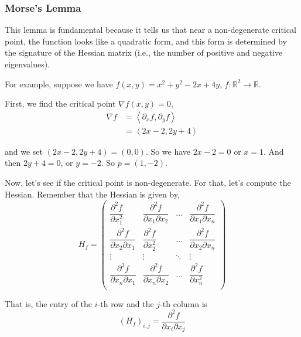 \subsubsection{Morse's Lemma}

This lemma is fundamental because it tells us that near a non-degenerate critical point, the function looks
like a quadratic form, and this form is determined by the signature of the Hessian matrix
(i.e., the number of positive and negative eigenvalues).

For example, suppose we have $f(x,y) = x^2 + y^2 - 2x + 4y$, $f : \mathbb{R}^2 \rightarrow \mathbb{R}$.

First, we find the critical point $\nabla f(x,y) = 0$,
\begin{align*}
\nabla f &= \left< \partial_x f, \partial_y f \right> \\
&= \left< 2x -2, 2y + 4 \right>
\end{align*}

and we set $\left( 2x -2, 2y + 4 \right) = \left( 0, 0 \right)$.
So we have $2x - 2 = 0$ or $x = 1$.
And then $2y + 4 = 0$, or $y = -2$.
So $p = (1, -2)$.

Now, let's see if the critical point is non-degenerate.
For that, let's compute the Hessian.
Remember that the Hessian is given by,
$$
H_f
=
\begin{pmatrix} 
    \dfrac{\partial^2 f}{\partial x_{1}^{2}}         & \dfrac{\partial^2 f}{\partial x_1 \partial x_2} & \dots  & \dfrac{\partial^2 f}{\partial x_1 \partial x_n}  \\[2.2ex]
    \dfrac{\partial^2 f}{\partial x_2 \partial x_1}  & \dfrac{\partial^2 f}{\partial x_{2}^{2}}        & \dots  & \dfrac{\partial^2 f}{\partial x_2 \partial x_n}  \\[2.2ex]
    \vdots                                           & \vdots                                          & \ddots & \vdots                                           \\[2.2ex]
    \dfrac{\partial^2 f}{\partial x_n \partial x_1}  & \dfrac{\partial^2 f}{\partial x_n \partial x_2} & \dots  & \dfrac{\partial^2 f}{\partial x_{n}^{2}}         \\
\end{pmatrix}
$$

That is, the entry of the $i$-th row and the $j$-th column is
$$
\left(H_f\right)_{i,j} = \frac{\partial^2 f}{\partial x_i \partial x_j}
$$

